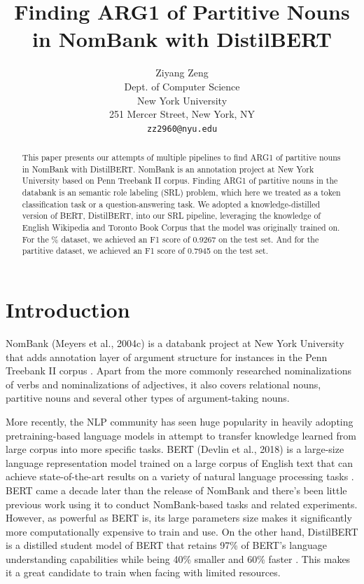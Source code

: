 \documentclass[11pt]{article}
\title{Finding ARG1 of Partitive Nouns in NomBank with DistilBERT}
\author{Ziyang Zeng \\
  Dept. of Computer Science \\
  New York University \\
  251 Mercer Street, New York, NY \\
  \texttt{zz2960@nyu.edu}}
\begin{document}
\maketitle
\begin{abstract}
  This paper presents our attempts of multiple pipelines to find ARG1 of partitive nouns in NomBank with DistilBERT. NomBank is an annotation project at New York University based on Penn Treebank II corpus. Finding ARG1 of partitive nouns in the databank is an semantic role labeling (SRL) problem, which here we treated as a token classification task or a question-answering task. We adopted a knowledge-distilled version of BERT, DistilBERT, into our SRL pipeline, leveraging the knowledge of English Wikipedia and Toronto Book Corpus that the model was originally trained on. For the \% dataset, we achieved an F1 score of 0.9267 on the test set. And for the partitive dataset, we achieved an F1 score of 0.7945 on the test set.
\end{abstract}

\section{Introduction}

NomBank (Meyers et al., 2004c) is a databank project at New York University that adds annotation layer of argument structure for instances in the Penn Treebank II corpus \cite{meyers2004nombank}. Apart from the more commonly researched nominalizations of verbs and nominalizations of adjectives, it also covers relational nouns, partitive nouns and several other types of argument-taking nouns.

More recently, the NLP community has seen huge popularity in heavily adopting pretraining-based language models in attempt to transfer knowledge learned from large corpus into more specific tasks. BERT (Devlin et al., 2018) is a large-size language representation model trained on a large corpus of English text that can achieve state-of-the-art results on a variety of natural language processing tasks \cite{devlin2018bert}. BERT came a decade later than the release of NomBank and there's been little previous work using it to conduct NomBank-based tasks and related experiments. However, as powerful as BERT is, its large parameters size makes it significantly more computationally expensive to train and use. On the other hand, DistilBERT is a distilled student model of BERT that retains 97\% of BERT's language understanding capabilities while being 40\% smaller and 60\% faster \cite{sanh2019distilbert}. This makes it a great candidate to train when facing with limited resources.
\end{document}

